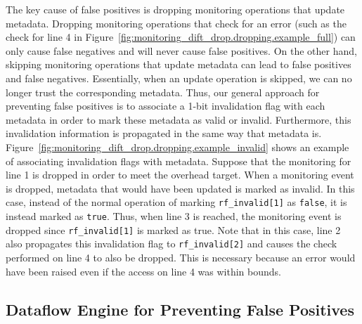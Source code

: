 The key cause of false positives is dropping monitoring operations that update
metadata. Dropping monitoring operations that check for an error (such as the
check for line 4 in
Figure~\ref{fig:monitoring_dift_drop.dropping.example_full}) can only cause
false negatives and will never cause false positives. On the other hand,
skipping monitoring operations that update metadata can lead to false positives
and false negatives.  Essentially, when an update operation is skipped, we can
no longer trust the corresponding metadata. Thus, our general approach for
preventing false positives is to associate a 1-bit invalidation flag with each
metadata in order to mark these metadata as valid or invalid. Furthermore, this
invalidation information is propagated in the same way that metadata is.
Figure~\ref{fig:monitoring_dift_drop.dropping.example_invalid} shows an example
of associating invalidation flags with metadata. Suppose that the monitoring
for line 1 is dropped in order to meet the overhead target. When a monitoring
event is dropped, metadata that would have been updated is marked as invalid.
In this case, instead of the normal operation of marking {\tt rf\_invalid[1]}
as {\tt false}, it is instead marked as {\tt true}. Thus, when line 3 is
reached, the monitoring event is dropped since {\tt rf\_invalid[1]} is marked
as true. Note that in this case, line 2 also propagates this invalidation flag
to {\tt rf\_invalid[2]} and causes the check performed on line 4 to also be
dropped. This is necessary because an error would have been raised even if the
access on line 4 was within bounds.

\subsection{Dataflow Engine for Preventing False Positives}
\label{sec:monitoring_dift_drop.dropping.arch}

